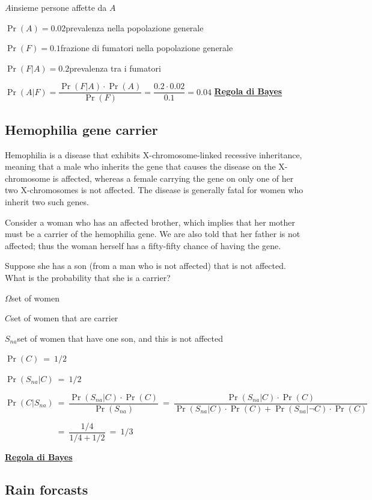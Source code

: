\documentclass[12pt,openany]{book}
\theoremstyle{mio}
\theoremstyle{liscio}
\begin{document}
$A$\hfill insieme persone affette da $A$

$\Pr(A)=0.02$\hfill prevalenza nella popolazione generale

$\Pr(F)=0.1$\hfill frazione di fumatori nella popolazione generale

$\Pr(F|A)=0.2$\hfill prevalenza tra i fumatori

$\Pr(A|F)=\dfrac{\Pr(F|A)\cdot \Pr(A)}{\Pr(F)}=\dfrac{0.2\cdot0.02}{0.1}=0.04$
\hfill{}\clearpage\hfill
\hfill\textbf{{\color{brown}\hyperref[RegolaBayes]{Regola di Bayes} \faShare}}
\subsection{Hemophilia gene carrier }
\label{Hemophilia}

Hemophilia is a disease that exhibits X-chromosome-linked recessive inheritance, meaning that a male who inherits the gene that causes the disease on the X-chromosome is affected, whereas a
female carrying the gene on only one of her two X-chromosomes is not affected. The disease is generally fatal for women who inherit two such genes.

Consider a woman who has an affected brother, which implies that her mother must be a carrier of the hemophilia gene. We are also told that her father is not affected; thus the woman herself has a fifty-fifty chance of having the gene.

Suppose she has a son (from a man who is not affected) that is not affected. What is the probability that she is a carrier?

$\Omega$\hfill  set of women 

$C$\hfill set of women that are carrier

$S_{na}$\hfill set of women that have one son, and this is not affected

$\Pr(C)\ =\ 1/2$\hfill 

$\Pr(S_{na}|C)\ =\ 1/2$\hfill 

$\Pr(C|S_{na})\ =\ \dfrac{\Pr(S_{na}|C)\cdot \Pr(C)}{\Pr(S_{na})}\ =\ \dfrac{\Pr(S_{na}|C)\cdot \Pr(C)}{\Pr(S_{na}|C)\cdot \Pr(C)+\Pr(S_{na}|\neg C)\cdot \Pr(C)}$

$\phantom{\Pr(C|S_{na})}\ =\ \dfrac{1/4}{1/4+1/2}\ =\ 1/3$


\hfill{}\clearpage\hfill
\textbf{{\color{brown}\hyperref[RegolaBayes]{Regola di Bayes} \faShare}}
\subsection{Rain forcasts}
\label{rain_desert}
\end{document}
